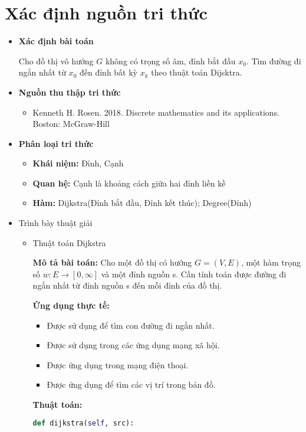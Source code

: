 \section{Xác định nguồn tri thức} 

\begin{itemize}
	\item \textbf{Xác định bài toán}
	
	Cho đồ thị vô hướng $G$ không có trọng số âm, đỉnh bắt đầu $x_0$. Tìm đường đi ngắn nhất từ $x_0$ đến đỉnh bất kỳ $x_k$ theo thuật toán Dijsktra.
	
	\item \textbf{Nguồn thu thập tri thức}
	\begin{itemize}
		\item Kenneth H. Rosen. 2018. Discrete mathematics and its applications. Boston: McGraw-Hill
	\end{itemize}
	
	\item \textbf{Phân loại tri thức}
	\begin{itemize}
		\item \textbf{Khái niệm: } Đỉnh, Cạnh
		\item \textbf{Quan hệ: } Cạnh là khoảng cách giữa hai đỉnh liền kề
		\item \textbf{Hàm: } Dijkstra(Đỉnh bắt đầu, Đỉnh kết thúc); Degree(Đỉnh)
	\end{itemize}
	\item Trình bày thuật giải
	\begin{itemize}
		\item Thuật toán Dijkstra
		
		\textbf{Mô tả bài toán:} Cho một đồ thị có hướng $G=(V,E)$, một hàm trọng số $w: E \rightarrow [0,\infty]$ và một đỉnh nguồn s. Cần tính toán được đường đi ngắn nhất từ đỉnh nguồn s đến mỗi đỉnh của đồ thị.
		
		\textbf{Ứng dụng thực tế:}
		\begin{itemize}
			\item Được sử dụng để tìm con đường đi ngắn nhất.
			\item Được sử dụng trong các ứng dụng mạng xã hội.
			\item Được ứng dụng trong mạng điện thoại.
			\item Được ứng dụng để tìm các vị trí trong bản đồ.
		\end{itemize}
	
	
		\textbf{Thuật toán:}
		\begin{lstlisting}[language=Python, caption=Mã giải của thuật toán Dijkstra]
			def dijkstra(self, src):
			

\end{lstlisting}
\end{itemize}
\end{itemize}
